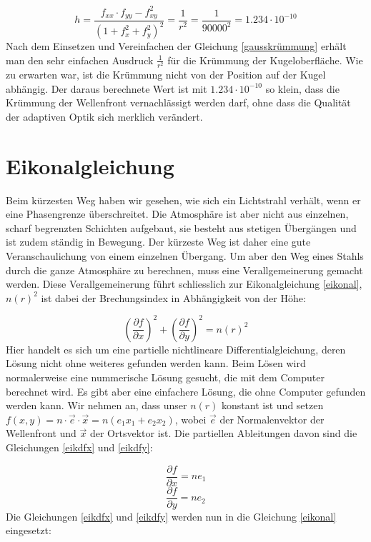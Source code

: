 \begin{refsection}
\begin{equation}\label{gausskrümmung}
h = \dfrac{f_{xx} \cdot f_{yy} -f_{xy}^{2}}{(1+f_{x}^{2}+f_{y}^{2})^{2}} = \dfrac{1}{r^{2}} =\dfrac{1}{90000^{2}} = 1.234\cdot 10^{-10}
\end{equation}
Nach dem Einsetzen und Vereinfachen der Gleichung \eqref{gausskrümmung} erhält man den sehr einfachen Ausdruck $\frac{1}{r^{2}}$ für die Krümmung der Kugeloberfläche. Wie zu erwarten war, ist die Krümmung nicht von der Position auf der Kugel abhängig. 
Der daraus berechnete Wert ist mit $1.234\cdot 10^{-10}$ so klein, dass die Krümmung der Wellenfront vernachlässigt werden darf, ohne dass die Qualität der adaptiven Optik sich merklich verändert.

\section{Eikonalgleichung}
Beim kürzesten Weg haben wir gesehen, wie sich ein Lichtstrahl verhält, wenn er eine Phasengrenze überschreitet. Die Atmosphäre ist aber nicht aus einzelnen, scharf begrenzten Schichten aufgebaut, sie besteht aus stetigen Übergängen und ist zudem ständig in Bewegung. Der kürzeste Weg ist daher eine gute Veranschaulichung von einem einzelnen Übergang. Um aber den Weg eines Stahls durch die ganze Atmosphäre zu berechnen, muss eine Verallgemeinerung gemacht werden. Diese Verallgemeinerung führt schliesslich zur Eikonalgleichung \eqref{eikonal}, $n(r)^{2}$ ist dabei der Brechungsindex in Abhängigkeit von der Höhe: 

\begin{equation}\label{eikonal}
\left( \dfrac{\partial f}{\partial x}\right)^{2} + \left( \dfrac{\partial f}{\partial y}\right) ^{2} = n(r)^{2}
\end{equation}
Hier handelt  es sich um eine partielle nichtlineare Differentialgleichung, deren Lösung nicht ohne weiteres gefunden werden kann. Beim Lösen wird normalerweise eine nummerische Lösung gesucht, die mit dem Computer berechnet wird. Es gibt aber eine einfachere Lösung, die ohne Computer gefunden werden kann. Wir nehmen an, dass unser $n(r)$ konstant ist und setzen $f(x,y)=n\cdot\vec{e}\cdot\vec{x}= n(e_{1}x_{1}+e_{2}x_{2})$, wobei $\vec{e}$ der Normalenvektor der Wellenfront und $\vec{x}$ der Ortsvektor ist. Die partiellen Ableitungen davon sind die Gleichungen \eqref{eikdfx} und \eqref{eikdfy}:

\begin{equation}\label{eikdfx}
\dfrac{\partial f}{\partial x} = ne_{1}
\end{equation}
\begin{equation}\label{eikdfy}
\dfrac{\partial f}{\partial y} = ne_{2}
\end{equation}
Die Gleichungen \eqref{eikdfx} und \eqref{eikdfy} werden nun in die Gleichung \eqref{eikonal} eingesetzt:


\end{refsection}
